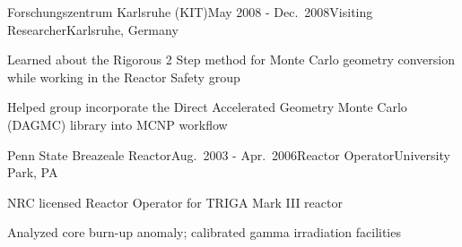 
\begin{rSubsection}{Forschungszentrum Karlsruhe (KIT)}{May 2008 - Dec.\ 2008}{Visiting Researcher}{Karlsruhe, Germany}
\item Learned about the Rigorous 2 Step method for Monte Carlo geometry conversion while working in the Reactor Safety group
\item Helped group incorporate the Direct Accelerated Geometry Monte Carlo (DAGMC) library into MCNP workflow
\end{rSubsection}




\begin{rSubsection}{Penn State Breazeale Reactor}{Aug.\ 2003 - Apr.\ 2006}{Reactor Operator}{University Park, PA}
\item NRC licensed Reactor Operator for TRIGA Mark III reactor
\item Analyzed core burn-up anomaly; calibrated gamma irradiation facilities
\end{rSubsection}
